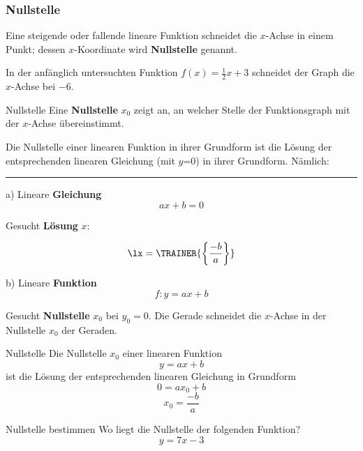 \subsubsection{Nullstelle}
Eine steigende oder fallende lineare Funktion schneidet die $x$-Achse
in einem Punkt; dessen $x$-Koordinate wird \textbf{Nullstelle} genannt.

In der anfänglich untersuchten Funktion $f(x) = \frac12x+3$ schneidet
der Graph die $x$-Achse bei $-6$. 

\begin{definition}{Nullstelle}{}
  Eine \textbf{Nullstelle} $x_0$ zeigt an, an welcher Stelle der
  Funktionsgraph mit der $x$-Achse übereinstimmt.
\end{definition}


Die Nullstelle einer linearen Funktion in ihrer Grundform ist die Lösung der entsprechenden linearen Gleichung (mit
$y$=0) in ihrer Grundform. Nämlich:

\hrule

a) Lineare \textbf{Gleichung} $$ax+b=0$$

Gesucht \textbf{Lösung} $x$:




\vspace{3mm}
$$\lx = \TRAINER{\left\{\frac{-b}{a}\right\}}  $$

\newpage
b) Lineare \textbf{Funktion} $$f: y=ax+b$$

Gesucht \textbf{Nullstelle} $x_0$ bei $y_0=0$. Die Gerade schneidet
die $x$-Achse in der Nullstelle $x_0$ der Geraden.

\begin{gesetz}{Nullstelle}{}
  Die Nullstelle $x_0$ einer linearen Funktion $$y=ax+b$$ ist die Lösung der
  entsprechenden linearen Gleichung in Grundform $$0=ax_0+b$$
  $$x_0 = \frac{-b}{a}$$
\end{gesetz}

\begin{beispiel}{Nullstelle bestimmen}{}
  Wo liegt die Nullstelle der folgenden Funktion?
  $$y=7x-3$$
  
\end{beispiel}
\newpage


